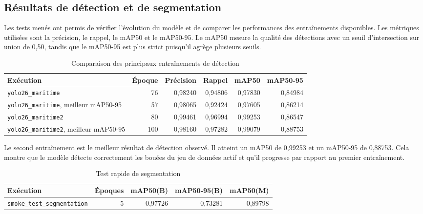 \documentclass[11pt,letterpaper]{article}
\begin{document}
\subsection{Résultats de détection et de segmentation}

Les tests menés ont permis de vérifier l'évolution du modèle et de comparer les performances des entraînements disponibles. Les métriques utilisées sont la précision, le rappel, le mAP50 et le mAP50-95. Le mAP50 mesure la qualité des détections avec un seuil d'intersection sur union de 0,50, tandis que le mAP50-95 est plus strict puisqu'il agrège plusieurs seuils.

\begin{table}[H]
    \centering
    \caption{Comparaison des principaux entraînements de détection}
    \begin{tabular}{L{5.6cm}rrrrr}
        \toprule
        Exécution & Époque & Précision & Rappel & mAP50 & mAP50-95 \\
        \midrule
        \texttt{yolo26\_maritime} & 76 & 0,98240 & 0,94806 & 0,97830 & 0,84984 \\
        \texttt{yolo26\_maritime}, meilleur mAP50-95 & 57 & 0,98065 & 0,92424 & 0,97605 & 0,86214 \\
        \texttt{yolo26\_maritime2} & 80 & 0,99461 & 0,96994 & 0,99253 & 0,86547 \\
        \texttt{yolo26\_maritime2}, meilleur mAP50-95 & 100 & 0,98160 & 0,97282 & 0,99079 & 0,88753 \\
        \bottomrule
    \end{tabular}
\end{table}

Le second entraînement est le meilleur résultat de détection observé. Il atteint un mAP50 de 0,99253 et un mAP50-95 de 0,88753. Cela montre que le modèle détecte correctement les bouées du jeu de données actif et qu'il progresse par rapport au premier entraînement.

\begin{table}[H]
    \centering
    \caption{Test rapide de segmentation}
    \begin{tabular}{L{5.4cm}rrrr}
        \toprule
        Exécution & Époques & mAP50(B) & mAP50-95(B) & mAP50(M) \\
        \midrule
        \texttt{smoke\_test\_segmentation} & 5 & 0,97726 & 0,73281 & 0,89798 \\
        \bottomrule
    \end{tabular}
\end{table}
\end{document}
